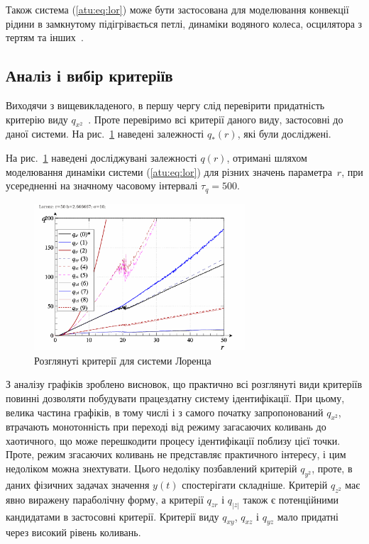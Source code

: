 Також система (\ref{atu:eq:lor}) може бути застосована для моделювання
конвекції рідини в замкнутому підігрівається петлі, динаміки
водяного колеса, осцилятора з тертям
та інших~\cite{kuznetsov_dyn_chaos,atu_arsirii}.



\subsection{Аналіз і вибір критеріїв} %

Виходячи з вищевикладеного, в першу чергу слід перевірити придатність критерію
виду $q_{x^2}$~\cite{atu_apir2012}.
Проте перевіримо всі критерії даного виду, застосовні до
даної системи. На рис.~\ref{atu:f:lor_q} наведені залежності
$q_{*}(r)$, які були досліджені.

На рис.~\ref{atu:f:lor_q} наведені досліджувані залежності
$q(r)$, отримані шляхом моделювання динаміки системи (\ref{atu:eq:lor})
для різних значень параметра~$r$, при усередненні на значному часовому інтервалі
$ \tau_q = 500 $.


\begin{figure}[ht!]
  \begin{center}
    \includegraphics[width=0.7\textwidth]{p/cha/lor/lor_q-p_q_r.png}
  \end{center}
  \caption{Розглянуті критерії для системи Лоренца}
  \label{atu:f:lor_q}
\end{figure}

З аналізу графіків зроблено висновок, що практично всі розглянуті види
критеріїв повинні дозволяти побудувати працездатну систему ідентифікації. При
цьому, велика частина графіків, в тому числі і з самого початку запропонований
$q_{x^2}$, втрачають монотонність при переході від режиму загасаючих
коливань до хаотичного,
що може перешкодити процесу ідентифікації поблизу цієї
точки. Проте, режим згасаючих коливань не представляє
практичного інтересу, і цим недоліком можна знехтувати. Цього
недоліку позбавлений критерій
$ q_{y^2} $, проте, в даних фізичних задачах значення
$ y (t) $ спостерігати складніше. Критерій
$ q_{z^2} $ має явно виражену параболічну форму, а критерії
$ q_{zr} $ і
$ q_{|z|} $ також є потенційними кандидатами в застосовні
критерії. Критерії виду
$ q_{xy} $,
$ q_{xz} $ і
$ q_{yz} $ мало придатні через високий рівень коливань.

